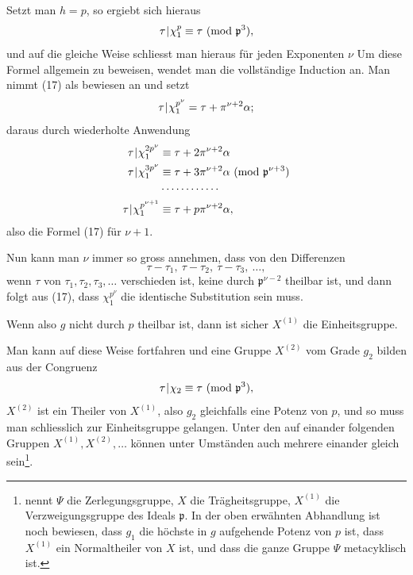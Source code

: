 Setzt man $h = p$, so ergiebt sich hieraus
\[ \tau\mkern1mu|\mkern1mu\chi_1^p \equiv \tau\ (\mathrm{mod}\ \mathfrak{p}^3), \]
und auf die gleiche Weise schliesst man hieraus für jeden Exponenten $\nu$
Um diese Formel allgemein zu beweisen, wendet man die vollständige Induction an. Man nimmt (17) als bewiesen an und setzt
\[ \tau\mkern1mu|\mkern1mu\chi_1^{p^\nu} = \tau + \pi^{\nu+2}\alpha; \]
daraus durch wiederholte Anwendung
\[
\begin{aligned}
\tau\mkern1mu|\mkern1mu\chi_1^{2p^\nu} &\equiv \tau + 2\pi^{\nu+2}\alpha \\
\tau\mkern1mu|\mkern1mu\chi_1^{3p^\nu} &\equiv \tau + 3\pi^{\nu+2}\alpha\ (\mathrm{mod}\ \mathfrak{p}^{\nu+3}) \\
&\cdots\cdots\cdots\cdots \\
\tau\mkern1mu|\mkern1mu\chi_1^{p^{\nu+1}} &\equiv \tau + p\pi^{\nu+2}\alpha,
\end{aligned}
\]
also die Formel (17) für $\nu + 1$.

Nun kann man $\nu$ immer so gross annehmen, dass von den Differenzen
\[ \tau - \tau_1,\ \tau - \tau_2,\ \tau - \tau_3,\ \ldots, \]
wenn $\tau$ von $\tau_1, \tau_2, \tau_3, \ldots$ verschieden ist, keine durch $\mathfrak{p}^{\nu-2}$ theilbar ist, und dann folgt aus (17), dass $\chi_1^{p^\nu}$ die identische Substitution sein muss. 

Wenn also $g$ nicht durch $p$ theilbar ist, dann ist sicher $X^{(1)}$ die Einheitsgruppe.

Man kann auf diese Weise fortfahren und eine Gruppe $X^{(2)}$ vom Grade $g_2$ bilden aus der Congruenz
\[ \tau\mkern1mu|\mkern1mu\chi_2 \equiv \tau\ (\mathrm{mod}\ \mathfrak{p}^3), \]
$X^{(2)}$ ist ein Theiler von $X^{(1)}$, also $g_2$ gleichfalls eine Potenz von $p$, und so muss man schliesslich zur Einheitsgruppe gelangen. Unter den auf einander folgenden Gruppen $X^{(1)}, X^{(2)}, \ldots$ können unter Umständen auch mehrere einander gleich sein\footnote{ nennt $\Psi$ die Zerlegungsgruppe, $X$ die Trägheitsgruppe, $X^{(1)}$ die Verzweigungsgruppe des Ideals $\mathfrak{p}$. In der oben erwähnten Abhandlung ist noch bewiesen, dass $g_1$ die höchste in $g$ aufgehende Potenz von $p$ ist, dass $X^{(1)}$ ein Normaltheiler von $X$ ist, und dass die ganze Gruppe $\Psi$ metacyklisch ist.}.
